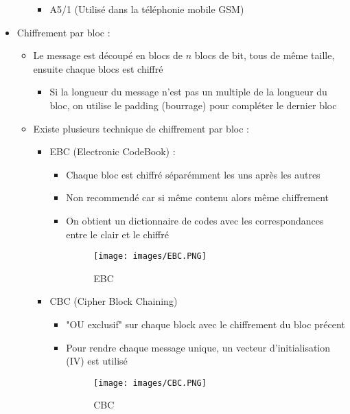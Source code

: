 \documentclass[a4paper]{article}
\begin{document}
\begin{itemize}[label=\textbullet, font=\Large]
\begin{itemize}[label=, font=\scriptsize]
\begin{itemize}
            \item A5/1 (Utilisé dans la téléphonie mobile GSM)
        \end{itemize}
    \end{itemize}
    \item Chiffrement par bloc :
    \begin{itemize}[label=, font=\scriptsize]
        \item Le message est découpé en blocs de $n$ blocs de bit, tous de même taille, ensuite chaque blocs est chiffré
        \begin{itemize}
            \item Si la longueur du message n'est pas un multiple de la longueur du bloc, on utilise le padding (bourrage) pour compléter le dernier bloc
        \end{itemize}
        \item Existe plusieurs technique de chiffrement par bloc :
        \begin{itemize}
            \item EBC (Electronic CodeBook) : 
            \begin{itemize}
                \item Chaque bloc est chiffré séparémment les uns après les autres
                \item Non recommendé car si même contenu alors même chiffrement
                \item On obtient un dictionnaire de codes avec les correspondances entre le clair et le chiffré
                \begin{figure}[H]
                    \centering
                    \texttt{[image: images/EBC.PNG]}
                    \caption{EBC}
                \end{figure}
            \end{itemize}
            \item CBC (Cipher Block Chaining)
            \begin{itemize}
                \item "OU exclusif" sur chaque block avec le chiffrement du bloc précent
                \item Pour rendre chaque message unique, un vecteur d'initialisation (IV) est utilisé
                \begin{figure}[H]
                    \centering
                    \texttt{[image: images/CBC.PNG]}
                    \caption{CBC}
                \end{figure}

\end{itemize}
\end{itemize}
\end{itemize}
\end{itemize}
\end{document}
